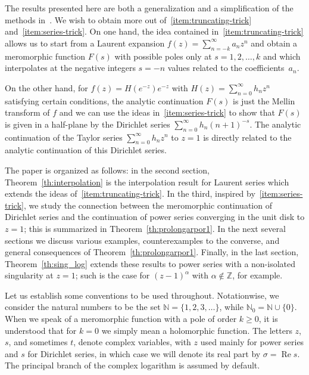\documentclass[11pt,a4paper]{amsart}
\newcommand{\N}{\mathbb{N}}
\newcommand{\Z}{\mathbb{Z}}
\renewcommand{\Re}{\operatorname{Re}}
\theoremstyle{plain}
\theoremstyle{plain}
\theoremstyle{plain}
\theoremstyle{definition}
\theoremstyle{remark}
\begin{document}
The results presented here are both a generalization and a simplification of the methods in~\cite{AppellSpecialValues}. We wish to obtain more out of~\eqref{item:truncating-trick} and~\eqref{item:series-trick}. On one hand, the idea contained in~\eqref{item:truncating-trick} allows us to start from a Laurent expansion $f(z) = \sum_{n=-k}^{\infty} a_{n} z^{n}$ and obtain a meromorphic function $F(s)$ with possible poles only at $s=1,2,\dots,k$ and which interpolates at the negative integers $s=-n$ values related to the coefficients~$a_{n}$.


On the other hand, for $f(z) =H(e^{-z})e^{-z}$ with $H(z) = \sum_{n=0}^{\infty} h_{n} z^{n}$ satisfying certain conditions, the analytic continuation $F(s)$ is just the Mellin transform of $f$ and we can use the ideas in~\eqref{item:series-trick} to show that $F(s)$ is given in a half-plane by the Dirichlet series $\sum_{n=0}^{\infty} h_{n} (n+1)^{-s}$. The analytic continuation of the Taylor series $\sum_{n=0}^{\infty} h_{n} z^{n}$ to $z=1$ is directly related to the analytic continuation of this Dirichlet series.

The paper is organized as follows: in the second section, Theorem~\ref{th:interpolation} is the interpolation result for Laurent series which extends the ideas of~\eqref{item:truncating-trick}. In the third, inspired by~\eqref{item:series-trick}, we study the connection between the meromorphic continuation of Dirichlet series and the continuation of power series converging in the unit disk to $z=1$; this is summarized in Theorem~\ref{th:prolongarpor1}. In the next several sections we discuss various examples, counterexamples to the converse, and general consequences of Theorem~\ref{th:prolongarpor1}. Finally, in the last section, Theorem~\ref{th:sing_log} extends these results to power series with a non-isolated singularity at $z=1$; such is the case for $(z-1)^{\alpha}$ with $\alpha \notin \Z$, for example.

Let us establish some conventions to be used throughout. Notationwise, we consider the natural numbers to be the set $\N = \{1,2,3,\dots\}$, while $\N_{0} = \N \cup \{0\}$.
When we speak of a meromorphic function with a pole of order $k \geq 0$, it is understood that for $k=0$ we simply mean a holomorphic function. 
The letters $z$, $s$, and sometimes $t$, denote complex variables, with $z$ used mainly for power series and $s$ for Dirichlet series, in which case we will denote its real part by $\sigma = \Re s$. The principal branch of the complex logarithm is assumed by default.
\end{document}
